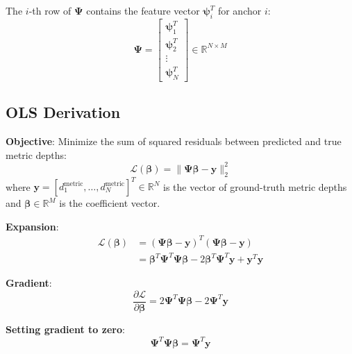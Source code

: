 \documentclass[11pt,a4paper]{article}
\begin{document}
The $i$-th row of $\boldsymbol{\Psi}$ contains the feature vector $\boldsymbol{\psi}_i^T$ for anchor $i$:
\begin{equation}
\boldsymbol{\Psi} = \begin{bmatrix} \boldsymbol{\psi}_1^T \\ \boldsymbol{\psi}_2^T \\ \vdots \\ \boldsymbol{\psi}_N^T \end{bmatrix} \in \mathbb{R}^{N \times M}
\end{equation}

\subsection{OLS Derivation}
\label{sec:ols}

\textbf{Objective}: Minimize the sum of squared residuals between predicted and true metric depths:
\begin{equation}
\mathcal{L}(\boldsymbol{\beta}) = \|\boldsymbol{\Psi}\boldsymbol{\beta} - \mathbf{y}\|_2^2
\label{eq:objective}
\end{equation}
where $\mathbf{y} = [d_1^{\text{metric}}, \ldots, d_N^{\text{metric}}]^T \in \mathbb{R}^N$ is the vector of ground-truth metric depths and $\boldsymbol{\beta} \in \mathbb{R}^M$ is the coefficient vector.

\textbf{Expansion}:
\begin{align}
\mathcal{L}(\boldsymbol{\beta}) &= (\boldsymbol{\Psi}\boldsymbol{\beta} - \mathbf{y})^T(\boldsymbol{\Psi}\boldsymbol{\beta} - \mathbf{y}) \nonumber \\
&= \boldsymbol{\beta}^T\boldsymbol{\Psi}^T\boldsymbol{\Psi}\boldsymbol{\beta} - 2\boldsymbol{\beta}^T\boldsymbol{\Psi}^T\mathbf{y} + \mathbf{y}^T\mathbf{y}
\label{eq:expansion}
\end{align}

\textbf{Gradient}:
\begin{equation}
\frac{\partial \mathcal{L}}{\partial \boldsymbol{\beta}} = 2\boldsymbol{\Psi}^T\boldsymbol{\Psi}\boldsymbol{\beta} - 2\boldsymbol{\Psi}^T\mathbf{y}
\label{eq:gradient}
\end{equation}

\textbf{Setting gradient to zero}:
\begin{equation}
\boldsymbol{\Psi}^T\boldsymbol{\Psi}\boldsymbol{\beta} = \boldsymbol{\Psi}^T\mathbf{y}
\end{equation}
\end{document}
